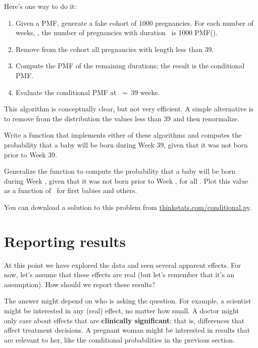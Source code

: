 \documentclass[12pt]{book}
\begin{document}
Here's one way to do it:

\begin{enumerate}

\item Given a PMF, generate a fake cohort of 1000 pregnancies.
For each number of weeks, \x, the number of pregnancies with
duration \x~is 1000 PMF(\x).

\item Remove from the cohort all pregnancies with length less than 39.

\item Compute the PMF of the remaining durations; the result is the
conditional PMF.

\item Evaluate the conditional PMF at \x~=~39 weeks.

\end{enumerate}

This algorithm is conceptually clear, but not very efficient.
A simple alternative is to remove from the distribution the values
less than 39 and then renormalize.

\begin{exercise}
Write a function that implements either of these algorithms and
computes the probability that a baby will be born during Week 39,
given that it was not born prior to Week 39.

Generalize the function to compute the
probability that a baby will be born during Week \x, given that
it was not born prior to Week \x, for all \x.
Plot this value as a function of \x~for first babies and others.

You can download a solution to this problem from
\url{thinkstats.com/conditional.py}.

\end{exercise}


\section{Reporting results}

At this point we have explored the data and seen several apparent
effects.  For now, let's assume that these effects are real (but let's
remember that it's an assumption).  How should we report these
results?

The answer might depend on who is asking the question.  For example, a
scientist might be interested in any (real) effect, no matter how
small.  A doctor might only care about effects that are {\bf
  clinically significant}; that is, differences that affect treatment
decisions.  A pregnant woman might be interested in results that are
relevant to her, like the conditional probabilities in the previous
section.
\end{document}
